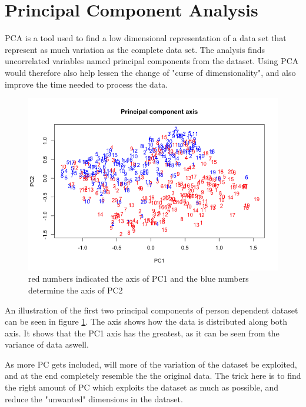 \section{Principal Component Analysis}
PCA is a tool used to find a low dimensional representation of a
data set that represent as much variation as the complete data set.
The analysis finds uncorrelated variables named principal components from the dataset.
Using PCA would therefore also help lessen the change of "curse of dimensionality",
and also improve the time needed to process the data. 

\begin{figure}[H]
\centering
\includegraphics[width = \textwidth]{graphics/PCa-axis.png}
\caption{ red numbers indicated the axis of PC1 and the blue numbers determine the axis of PC2}
\label{fig:pca_vis}
\end{figure}

An illustration of the first two principal components of person dependent
dataset can be seen in figure \ref{fig:pca_vis}.
The axis shows how the data is distributed along both axis. 
It shows that the PC1 axis has the greatest, as it can be seen from the variance of data aswell. 


As more PC gets included, will more of the variation of the dataset be exploited,
and at the end completely resemble the the original data.
The trick here is to find the right amount of PC which exploits the dataset as
much as possible, and reduce the "unwanted" dimensions in the dataset. 

